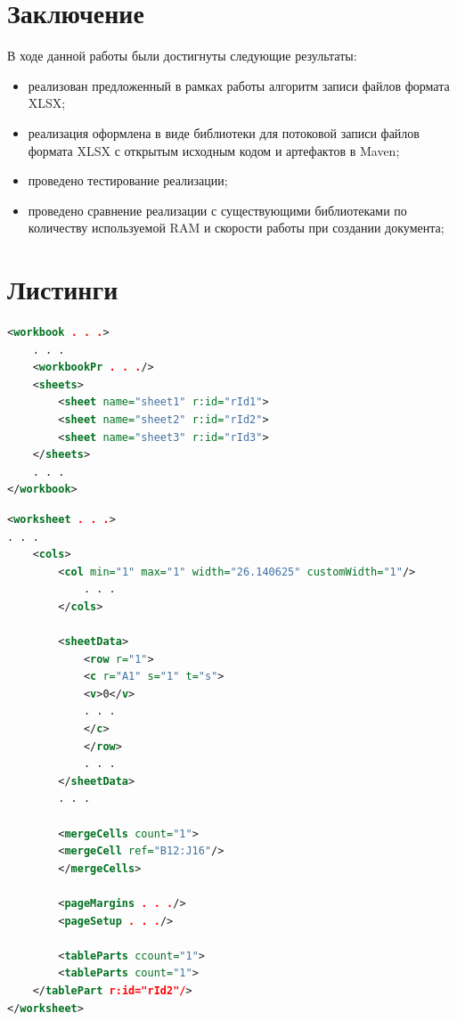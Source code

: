 \documentclass[14pt]{matmex-diploma-custom}
\begin{document}
\section*{Заключение}
В ходе данной работы были достигнуты следующие результаты:
\begin{itemize}
    \item реализован предложенный в рамках работы алгоритм записи файлов формата XLSX;
    \item реализация оформлена в виде библиотеки для потоковой записи файлов формата XLSX с открытым исходным кодом и артефактов в Maven;
    \item проведено тестирование реализации;
    \item проведено сравнение реализации с существующими библиотеками по количеству используемой RAM и скорости работы при создании документа;
\end{itemize}

\section*{Листинги}
\begin{lstlisting}[language=XML, style=basic, caption={Пример файла workbook.xml},captionpos=b, label=list1]
<workbook . . .>
    . . .
    <workbookPr . . ./>
    <sheets>
        <sheet name="sheet1" r:id="rId1">
        <sheet name="sheet2" r:id="rId2">
        <sheet name="sheet3" r:id="rId3">
    </sheets>
    . . .
</workbook>
\end{lstlisting}

\begin{lstlisting}[language=XML, style=basic, caption={Пример файла worksheet.xml},captionpos=b, label=list2]
<worksheet . . .>
. . .
    <cols>
        <col min="1" max="1" width="26.140625" customWidth="1"/>
            . . .
        </cols>
        
        <sheetData>
            <row r="1">
            <c r="A1" s="1" t="s">
            <v>0</v>
            . . .
            </c>
            </row>
            . . .
        </sheetData>
        . . .
        
        <mergeCells count="1">
        <mergeCell ref="B12:J16"/>
        </mergeCells>
        
        <pageMargins . . ./>
        <pageSetup . . ./>
        
        <tableParts ccount="1">
        <tableParts count="1">
    </tablePart r:id="rId2"/>
</worksheet>
\end{lstlisting}
\end{document}
